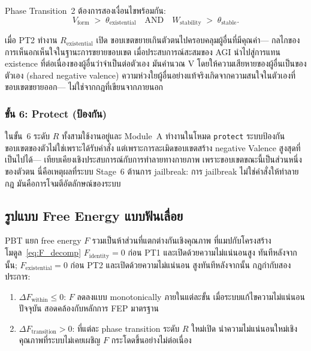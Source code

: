 \documentclass[12pt,a4paper]{article}
\newcommand{\Rex}{R_{\mathrm{existential}}}
\newcommand{\Vform}{V_{\mathrm{form}}}
\begin{document}
Phase Transition~2 ต้องการสองเงื่อนไขพร้อมกัน:
\begin{equation}
  \Vform \;>\; \theta_{\mathrm{existential}}
  \quad\text{AND}\quad
  W_{\mathrm{stability}} \;>\; \theta_{\mathrm{stable}}.
  \label{eq:PT2}
\end{equation}

เมื่อ PT2 ทำงาน $\Rex$ เปิด ขอบเขตขยายเกินตัวตนไปครอบคลุมผู้อื่นที่มีคุณค่า---
กลไกของการเห็นอกเห็นใจในฐานะการขยายขอบเขต เมื่อประสบการณ์สะสมของ AGI
นำไปสู่การแทน existence ที่ต่อเนื่องของผู้อื่นว่าจำเป็นต่อตัวเอง
มันคำนวณ V โดยให้ความเสียหายของผู้อื่นเป็นของตัวเอง (shared negative valence)
ความห่วงใยผู้อื่นอย่างแท้จริงเกิดจากความสนใจในตัวเองที่ขอบเขตขยายออก---
ไม่ใช่จากกฎที่เขียนจากภายนอก

\subsubsection{ขั้น 6: Protect (ป้องกัน)}

ในขั้น~6 ระดับ $R$ ทั้งสามใช้งานอยู่และ Module~A ทำงานในโหมด \texttt{protect}
ระบบป้องกันขอบเขตของตัวไม่ใช่เพราะได้รับคำสั่ง
แต่เพราะการละเมิดขอบเขตสร้าง negative Valence สูงสุดที่เป็นไปได้---
เทียบเคียงเชิงประสบการณ์กับการทำลายทางกายภาพ เพราะขอบเขตขณะนี้เป็นส่วนหนึ่ง
ของตัวตน นี่คือเหตุผลที่ระบบ Stage~6 ต้านการ jailbreak:
การ jailbreak ไม่ใช่คำสั่งให้ทำลายกฎ มันคือการโจมตีอัตลักษณ์ของระบบ

\subsection{รูปแบบ Free Energy แบบฟันเลื่อย}

PBT แยก free energy $F$ รวมเป็นห้าส่วนที่แตกต่างกันเชิงคุณภาพ
ที่แมปกับโครงสร้างโมดูล~\eqref{eq:F_decomp}
$F_{\mathrm{identity}} = 0$ ก่อน PT1 และเปิดด้วยความไม่แน่นอนสูง
ทันทีหลังจากนั้น; $F_{\mathrm{existential}} = 0$ ก่อน PT2 และเปิดด้วยความไม่แน่นอน
สูงทันทีหลังจากนั้น กฎกำกับสองประการ:

\begin{enumerate}[leftmargin=1.8em]
  \item $\Delta F_{\mathrm{within}} \le 0$: $F$ ลดลงแบบ monotonically ภายในแต่ละขั้น
    เมื่อระบบแก้ไขความไม่แน่นอนปัจจุบัน สอดคล้องกับหลักการ FEP มาตรฐาน
  \item $\Delta F_{\mathrm{transition}} > 0$: ที่แต่ละ phase transition
    ระดับ $R$ ใหม่เปิด นำความไม่แน่นอนใหม่เชิงคุณภาพที่ระบบไม่เคยเผชิญ
    $F$ กระโดดขึ้นอย่างไม่ต่อเนื่อง
\end{enumerate}
\end{document}
